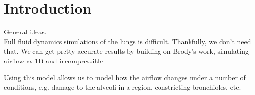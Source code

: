 \section{Introduction}

General ideas: \\
Full fluid dynamics simulations of the lungs is difficult. Thankfully, we don't need that. We can
get pretty accurate results by building on Brody's work, simulating airflow as 1D and
incompressible.

Using this model allows us to model how the airflow changes under a number of conditions, e.g.
damage to the alveoli in a region, constricting bronchioles, etc.
